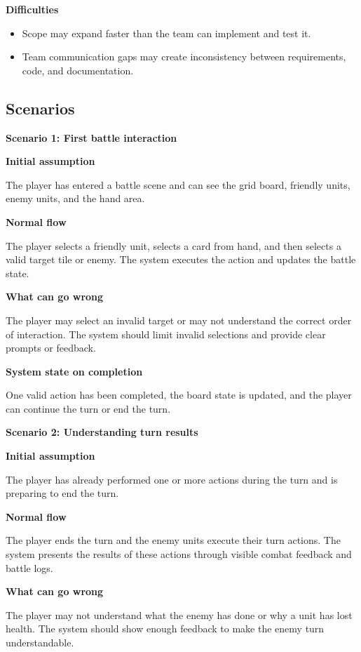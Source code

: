 \documentclass[12pt,a4paper]{report}
\begin{document}
\textbf{Difficulties}

\begin{itemize}
\item Scope may expand faster than the team can implement and test it.
\item Team communication gaps may create inconsistency between requirements, code, and documentation.
\end{itemize}

\subsection{Scenarios}

\textbf{Scenario 1: First battle interaction}

\textbf{Initial assumption}

The player has entered a battle scene and can see the grid board, friendly units, enemy units, and the hand area.

\textbf{Normal flow}

The player selects a friendly unit, selects a card from hand, and then selects a valid target tile or enemy. The system executes the action and updates the battle state.

\textbf{What can go wrong}

The player may select an invalid target or may not understand the correct order of interaction. The system should limit invalid selections and provide clear prompts or feedback.

\textbf{System state on completion}

One valid action has been completed, the board state is updated, and the player can continue the turn or end the turn.

\textbf{Scenario 2: Understanding turn results}

\textbf{Initial assumption}

The player has already performed one or more actions during the turn and is preparing to end the turn.

\textbf{Normal flow}

The player ends the turn and the enemy units execute their turn actions. The system presents the results of these actions through visible combat feedback and battle logs.

\textbf{What can go wrong}

The player may not understand what the enemy has done or why a unit has lost health. The system should show enough feedback to make the enemy turn understandable.
\end{document}
